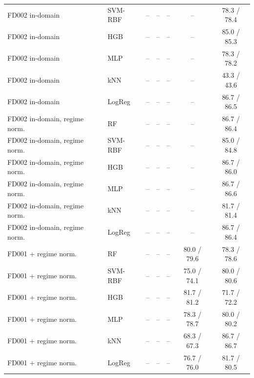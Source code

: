 \begin{table}[htbp]
\begin{tabular}{@{}llccccc@{}}
FD002 in-domain & SVM-RBF & -- & -- & -- & -- & 78.3 / 78.4 \\
FD002 in-domain & HGB & -- & -- & -- & -- & 85.0 / 85.3 \\
FD002 in-domain & MLP & -- & -- & -- & -- & 78.3 / 78.2 \\
FD002 in-domain & kNN & -- & -- & -- & -- & 43.3 / 43.6 \\
FD002 in-domain & LogReg & -- & -- & -- & -- & 86.7 / 86.5 \\
FD002 in-domain, regime norm. & RF & -- & -- & -- & -- & 86.7 / 86.4 \\
FD002 in-domain, regime norm. & SVM-RBF & -- & -- & -- & -- & 85.0 / 84.8 \\
FD002 in-domain, regime norm. & HGB & -- & -- & -- & -- & 86.7 / 86.0 \\
FD002 in-domain, regime norm. & MLP & -- & -- & -- & -- & 86.7 / 86.6 \\
FD002 in-domain, regime norm. & kNN & -- & -- & -- & -- & 81.7 / 81.4 \\
FD002 in-domain, regime norm. & LogReg & -- & -- & -- & -- & 86.7 / 86.4 \\
FD001 + regime norm. & RF & -- & -- & -- & 80.0 / 79.6 & 78.3 / 78.6 \\
FD001 + regime norm. & SVM-RBF & -- & -- & -- & 75.0 / 74.1 & 80.0 / 80.6 \\
FD001 + regime norm. & HGB & -- & -- & -- & 81.7 / 81.2 & 71.7 / 72.2 \\
FD001 + regime norm. & MLP & -- & -- & -- & 78.3 / 78.7 & 80.0 / 80.2 \\
FD001 + regime norm. & kNN & -- & -- & -- & 68.3 / 67.3 & 86.7 / 86.7 \\
FD001 + regime norm. & LogReg & -- & -- & -- & 76.7 / 76.0 & 81.7 / 80.5 \\
\bottomrule\end{tabular}\end{table}

